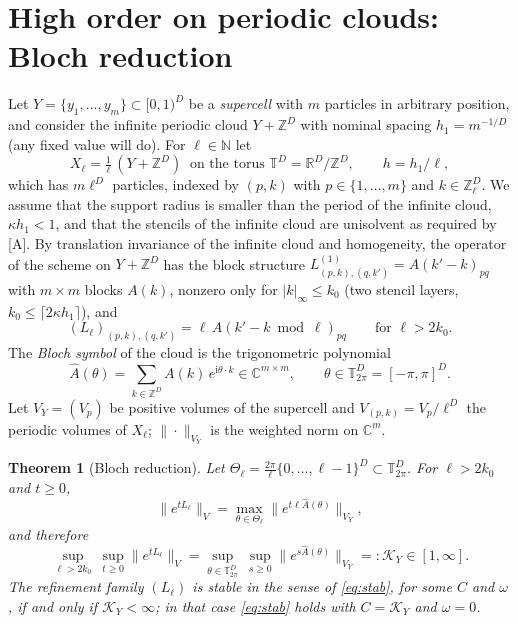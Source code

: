 \documentclass[11pt,a4paper]{article}
\theoremstyle{plain}
\newtheorem{theorem}{Theorem}[section]
\theoremstyle{definition}
\theoremstyle{remark}
\numberwithin{equation}{section}
\newcommand{\R}{\mathbb{R}}
\newcommand{\C}{\mathbb{C}}
\newcommand{\Z}{\mathbb{Z}}
\newcommand{\N}{\mathbb{N}}
\newcommand{\T}{\mathbb{T}}
\newcommand{\ii}{\mathrm{i}}
\begin{document}
\section{High order on periodic clouds: Bloch reduction}\label{sec:bloch}

Let $Y=\{y_1,\dots,y_m\}\subset[0,1)^D$ be a \emph{supercell} with $m$ particles in arbitrary position, and consider the infinite periodic cloud $Y+\Z^D$ with nominal spacing $h_1=m^{-1/D}$ (any fixed value will do). For $\ell\in\N$ let
\begin{equation}
X_\ell=\tfrac1\ell\,(Y+\Z^D)\ \text{ on the torus }\T^D=\R^D/\Z^D,\qquad h=h_1/\ell,
\end{equation}
which has $m\ell^D$ particles, indexed by $(p,k)$ with $p\in\{1,\dots,m\}$ and $k\in\Z_\ell^D$. We assume that the support radius is smaller than the period of the infinite cloud, $\kappa h_1<1$, and that the stencils of the infinite cloud are unisolvent as required by [A]. By translation invariance of the infinite cloud and homogeneity, the operator of the scheme on $Y+\Z^D$ has the block structure $L^{(1)}_{(p,k),(q,k')}=A(k'-k)_{pq}$ with $m\times m$ blocks $A(k)$, nonzero only for $|k|_\infty\le k_0$ (two stencil layers, $k_0\le\lceil2\kappa h_1\rceil$), and
\begin{equation}\label{eq:blockcirc}
(L_\ell)_{(p,k),(q,k')}=\ell\,A(k'-k \bmod \ell)_{pq}\qquad\text{for }\ell>2k_0 .
\end{equation}
The \emph{Bloch symbol} of the cloud is the trigonometric polynomial
\begin{equation}\label{eq:bloch}
\hat A(\theta)=\sum_{k\in\Z^D}A(k)\,e^{\ii\theta\cdot k}\in\C^{m\times m},\qquad\theta\in\T^D_{2\pi}=[-\pi,\pi]^D .
\end{equation}
Let $V_Y=(V_p)$ be positive volumes of the supercell and $V_{(p,k)}=V_p/\ell^D$ the periodic volumes of $X_\ell$; $\|\cdot\|_{V_Y}$ is the weighted norm on $\C^m$.

\begin{theorem}[Bloch reduction]\label{thm:bloch}
Let $\Theta_\ell=\frac{2\pi}{\ell}\{0,\dots,\ell-1\}^D\subset\T^D_{2\pi}$. For $\ell>2k_0$ and $t\ge0$,
\begin{equation}\label{eq:blochnorm}
\|e^{tL_\ell}\|_V=\max_{\theta\in\Theta_\ell}\big\|e^{t\ell\hat A(\theta)}\big\|_{V_Y},
\end{equation}
and therefore
\begin{equation}\label{eq:KY}
\sup_{\ell>2k_0}\ \sup_{t\ge0}\|e^{tL_\ell}\|_V=\sup_{\theta\in\T^D_{2\pi}}\ \sup_{s\ge0}\big\|e^{s\hat A(\theta)}\big\|_{V_Y}=:\mathcal K_Y\in[1,\infty].
\end{equation}
The refinement family $(L_\ell)$ is stable in the sense of \eqref{eq:stab}, for some $C$ and $\omega$, if and only if $\mathcal K_Y<\infty$; in that case \eqref{eq:stab} holds with $C=\mathcal K_Y$ and $\omega=0$.
\end{theorem}
\end{document}
